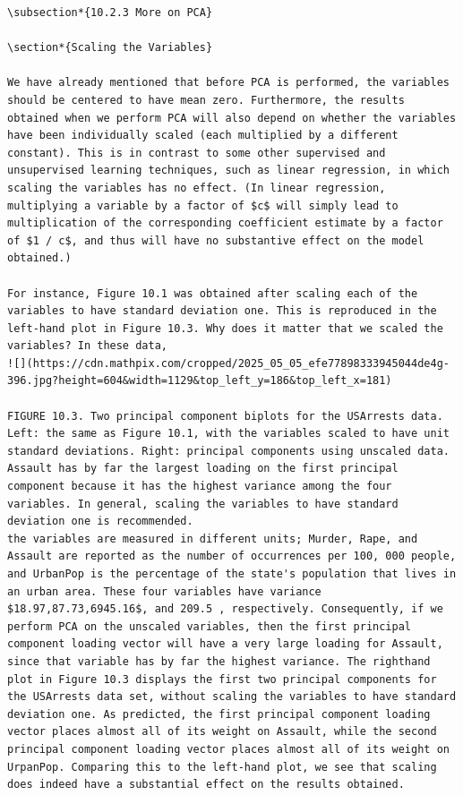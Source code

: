 \documentclass[10pt]{article}
\begin{document}
\begin{verbatim}
\subsection*{10.2.3 More on PCA}

\section*{Scaling the Variables}

We have already mentioned that before PCA is performed, the variables should be centered to have mean zero. Furthermore, the results obtained when we perform PCA will also depend on whether the variables have been individually scaled (each multiplied by a different constant). This is in contrast to some other supervised and unsupervised learning techniques, such as linear regression, in which scaling the variables has no effect. (In linear regression, multiplying a variable by a factor of $c$ will simply lead to multiplication of the corresponding coefficient estimate by a factor of $1 / c$, and thus will have no substantive effect on the model obtained.)

For instance, Figure 10.1 was obtained after scaling each of the variables to have standard deviation one. This is reproduced in the left-hand plot in Figure 10.3. Why does it matter that we scaled the variables? In these data,
![](https://cdn.mathpix.com/cropped/2025_05_05_efe77898333945044de4g-396.jpg?height=604&width=1129&top_left_y=186&top_left_x=181)

FIGURE 10.3. Two principal component biplots for the USArrests data. Left: the same as Figure 10.1, with the variables scaled to have unit standard deviations. Right: principal components using unscaled data. Assault has by far the largest loading on the first principal component because it has the highest variance among the four variables. In general, scaling the variables to have standard deviation one is recommended.
the variables are measured in different units; Murder, Rape, and Assault are reported as the number of occurrences per 100, 000 people, and UrbanPop is the percentage of the state's population that lives in an urban area. These four variables have variance $18.97,87.73,6945.16$, and 209.5 , respectively. Consequently, if we perform PCA on the unscaled variables, then the first principal component loading vector will have a very large loading for Assault, since that variable has by far the highest variance. The righthand plot in Figure 10.3 displays the first two principal components for the USArrests data set, without scaling the variables to have standard deviation one. As predicted, the first principal component loading vector places almost all of its weight on Assault, while the second principal component loading vector places almost all of its weight on UrpanPop. Comparing this to the left-hand plot, we see that scaling does indeed have a substantial effect on the results obtained.


\end{verbatim}
\end{document}
